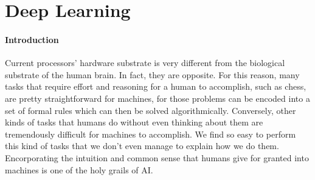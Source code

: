 \documentclass[../main.tex]{subfiles}
\begin{document}
    \section{Deep Learning}\label{sec:deeplearning}

    \paragraph{Introduction}
    Current processors' hardware substrate is very different from the biological substrate of the human brain. In fact, they are opposite.
    For this reason, many tasks that require effort and reasoning for a human to accomplish, such as chess, are pretty straightforward for machines,
    for those problems can be encoded into a set of formal rules which can then be solved algorithmically.
    Conversely, other kinds of tasks that humans do without even thinking about them are tremendously difficult for machines to accomplish.
    We find so easy to perform this kind of tasks that we don't even manage to explain how we do them. Encorporating the intuition
    and common sense that humans give for granted into machines is one of the holy grails of AI.\@
\end{document}
